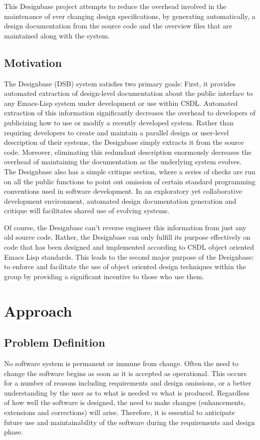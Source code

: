 This Designbase project attempts to reduce the overhead involved in
the maintenance of ever changing design specifications, by generating
automatically, a design documentation from the source code and the
overview files that are maintained along with the system.



\subsection{ Motivation}


The Designbase (DSB) system satisfies two primary goals: First, it
provides automated extraction of design-level documentation about the
public interface to any Emacs-Lisp system under development or use
within CSDL.  Automated extraction of this information significantly
decreases the overhead to developers of publicizing how to use or
modify a recently developed system.  Rather than requiring developers
to create and maintain a parallel design or user-level description of
their systems, the Designbase simply extracts it from the source code.
Moreover, eliminating this redundant description enormously decreases
the overhead of maintaining the documentation as the underlying system
evolves.  The Designbase also has a simple critique section, where a
series of checks are run on all the public functions to point out
omission of certain standard programming conventions used in software
development.  In an exploratory yet collaborative development
environment, automated design documentation generation and critique
will facilitates shared use of evolving systems.

Of course, the Designbase can't reverse engineer this information from
just any old source code.  Rather, the Designbase can only fulfill its
purpose effectively on code that has been designed and implemented
according to CSDL object oriented Emacs Lisp standards.  This leads to
the second major purpose of the Designbase: to enforce and facilitate
the use of object oriented design techniques within the group by
providing a significant incentive to those who use them.  


\section{ Approach}

\subsection{Problem Definition}
No software system is permanent or immune from change.  Often the need
to change the software begins as soon as it is accepted as
operational.  This occurs for a number of reasons including
requirements and design omissions, or a better understanding by the
user as to what is needed vs what is produced.  Regardless of how well
the software is designed, the need to make changes (enhancements,
extensions and corrections) will arise.  Therefore, it is essential to
anticipate future use and maintainability of the software during the
requirements and design phase.\cite{WMB84}

